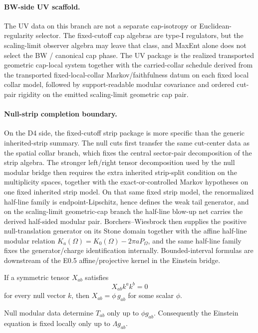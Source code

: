 \paragraph{BW-side UV scaffold.}
The UV data on this branch are not a separate cap-isotropy or Euclidean-regularity
selector. The fixed-cutoff cap algebras are type-I regulators, but the scaling-limit observer
algebra may leave that class, and MaxEnt alone does not select the BW / canonical cap phase. The
UV package is the realized transported geometric cap-local system together with the
carried-collar schedule derived from the transported fixed-local-collar Markov/faithfulness datum
on each fixed local collar model, followed by support-readable modular covariance and ordered
cut-pair rigidity on the emitted scaling-limit geometric cap pair.

\paragraph{Null-strip completion boundary.}
On the D4 side, the fixed-cutoff strip package is more specific than the generic inherited-strip summary.
The null cuts first transfer the same cut-center data as the spatial collar branch, which fixes
the central sector-pair decomposition of the strip algebra. The stronger left/right tensor
decomposition used by the null modular bridge then requires the extra inherited strip-split
condition on the multiplicity spaces, together with the exact-or-controlled Markov hypotheses on
one fixed inherited strip model. On that same fixed strip model, the renormalized half-line family
is endpoint-Lipschitz, hence defines the weak tail generator, and on the scaling-limit
geometric-cap branch the half-line blow-up net carries the derived half-sided modular pair.
Borchers--Wiesbrock then supplies the positive null-translation generator on its Stone domain
together with the affine half-line modular relation \(K_a(\Omega)=K_0(\Omega)-2\pi aP_\Omega\),
and the same half-line family fixes the generator/charge identification internally.
Bounded-interval formulas are downstream of the E0.5 affine/projective kernel in the Einstein bridge.

\begin{lemma}
If a symmetric tensor \(X_{ab}\) satisfies
\[
X_{ab}k^ak^b=0
\]
for every null vector \(k\), then \(X_{ab}=\phi\,g_{ab}\) for some scalar \(\phi\).
\end{lemma}

\begin{corollary}
Null modular data determine \(T_{ab}\) only up to \(\phi g_{ab}\). Consequently the Einstein
equation is fixed locally only up to \(\Lambda g_{ab}\).
\end{corollary}

